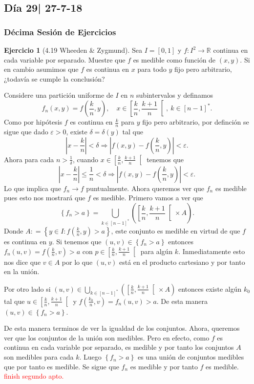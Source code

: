 \documentclass[12pt]{article}
\theoremstyle{plain}
\theoremstyle{definition}
\newtheorem{Ej}[Th]{Ejercicio}
\theoremstyle{remark}
\numberwithin{equation}{section}
\newcommand{\bR}{\mathbb{R}}        %
\renewcommand{\leq}{\leqslant}      %
\renewcommand{\:}{\colon}           %
\newcommand{\conj}[1]{\left\lbrace#1\right\rbrace}
\newcommand{\bonj}[1]{\left\lbrack#1\right\rbrack}
\newcommand{\lbonj}[1]{\left\lbrack#1\right\lbrack}
\begin{document}
\begin{multicols}{2}
\subsection{Día 29| 27-7-18}
\subsubsection*{Décima Sesión de Ejercicios}

\begin{Ej}[4.19  Wheeden \& Zygmund]
Sea $I=\bonj{0,1}$ y $f\: I^2\to \bR$ continua en cada variable por separado. Muestre que $f$ es medible como función de $(x,y)$. Si en cambio asumimos que $f$ es continua en $x$ para todo $y$ fijo pero arbitrario, ¿todavía se cumple la conclusión?
\end{Ej}

\begin{ptcbp}
Considere una partición uniforme de $I$ en $n$ subintervalos y definamos
$$f_n(x,y)=f\left(\frac{k}{n},y\right),\quad x\in\lbonj{\frac{k}{n},\frac{k+1}{n}},\ k\in\bonj{n-1}^*.$$
Como por hipótesis $f$ es continua en $\frac{k}{n}$ para $y$ fijo pero arbitrario, por definción se sigue que dado $\varepsilon>0$, existe $\delta=\delta(y)$ tal que
$$\left|x-\frac{k}{n}\right|<\delta\Rightarrow\left|f(x,y)-f\left(\frac{k}{n},y\right)\right|<\varepsilon.$$
Ahora para cada $n>\frac{1}{\delta}$, cuando $x\in\lbonj{\frac{k}{n},\frac{k+1}{n}}$ tenemos que
$$\left|x-\frac{k}{n}\right|\leq\frac{1}{n}<\delta\Rightarrow\left|f(x,y)-f\left(\frac{k}{n},y\right)\right|<\varepsilon.$$
Lo que implica que $f_n\to f$ puntualmente. Ahora queremos ver que $f_n$ es medible pues esto nos mostrará que $f$ es medible. Primero vamos a ver que
$$\conj{f_n>a}=\bigcup_{k\in\bonj{n-1}^*}\left(\lbonj{\frac{k}{n},\frac{k+1}{n}}\times A\right).$$
Donde $A\:=\conj{y\in I\: f(\frac{k}{n},y)>a}$, este conjunto es medible en virtud de que $f$ es continua en $y$. Si tenemos que $(u,v)\in\conj{f_n>a}$ entonces $f_n(u,v)=f\left(\frac{k}{n},v\right)>a$ con $p\in\lbonj{\frac{k}{n},\frac{k+1}{n}}$ para algún $k$. Inmediatamente esto nos dice que $v\in A$ por lo que $(u,v)$ está en el producto cartesiano y por tanto en la unión.\par
Por otro lado si $(u,v)\in\bigcup_{k\in\bonj{n-1}^*}\left(\lbonj{\frac{k}{n},\frac{k+1}{n}}\times A\right)$ entonces existe algún $k_0$ tal que $u\in\lbonj{\frac{k}{n},\frac{k+1}{n}}$ y $f(\frac{k_0}{n},v)=f_n(u,v)>a$. De esta manera $(u,v)\in\conj{f_n>a}$.\par
De esta manera terminos de ver la igualdad de los conjuntos. Ahora, queremos ver que los conjuntos de la unión son medibles. Pero en efecto, como $f$ es continua en cada variable por separado, es medible y por tanto los conjuntos $A$ son medibles para cada $k$. Luego $\conj{f_n>a}$ es una unión de conjuntos medibles que por tanto es medible. Se sigue que $f_n$ es medible y por tanto $f$ es medible.
\textcolor{red}{finish segundo apto.}
\end{ptcbp}


\end{multicols}
\end{document}
